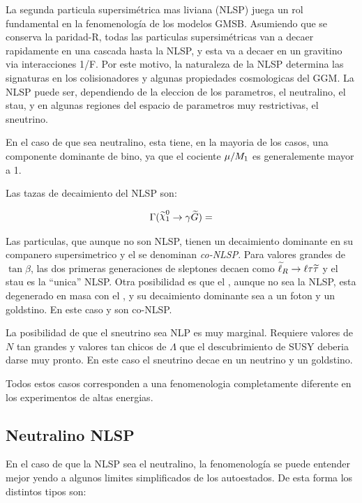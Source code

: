 La segunda particula supersimétrica mas liviana (NLSP) juega un rol
fundamental en la fenomenología de los modelos GMSB. Asumiendo que se
conserva la paridad-R, todas las particulas supersimétricas van a decaer
rapidamente en una cascada hasta la NLSP, y esta va a decaer en un gravitino
via interacciones 1/F. Por este motivo, la naturaleza de la NLSP
determina las signaturas en los colisionadores y algunas propiedades
cosmologicas del GGM. La NLSP puede ser, dependiendo de la eleccion 
de los parametros, el neutralino, el stau, y en algunas regiones del
espacio de parametros muy restrictivas, el sneutrino.

En el caso de que sea neutralino, esta tiene, en la mayoria de los
casos, una componente dominante de bino, ya que el cociente $\mu/M_{1}$
es generalemente mayor a 1. %

Las tazas de decaimiento del {\ninoone} NLSP son:

\begin{align}
  \Gamma (\ninoone \to \gamma \gravino) =
\end{align}

Las particulas, que aunque no son NLSP, tienen un decaimiento dominante en
su companero supersimetrico y el {\gravino} se denominan \emph{co-NLSP}.
Para valores grandes de $\tan \beta$, las dos primeras generaciones de
sleptones decaen como $\widetilde{\ell}_R \rightarrow \ell \tau \widetilde{\tau}$ y el stau
es la ``unica'' NLSP. Otra posibilidad es que el {\ninoone}, aunque no sea
la NLSP, esta degenerado en masa con el {\stau}, y su decaimiento dominante
sea a un foton y un goldstino. En este caso {\stau} y {\ninoone} son co-NLSP.

La posibilidad de que el sneutrino sea NLP es muy marginal. Requiere valores
de $N$ tan grandes y valores tan chicos de $\Lambda$ que el descubrimiento de
SUSY deberia darse muy pronto. En este caso el sneutrino decae en un neutrino
y un goldstino.

Todos estos casos corresponden a una fenomenologia completamente diferente en
los experimentos de altas energias.

\subsection{Neutralino NLSP}

En el caso de que la NLSP sea el neutralino, la fenomenología se puede entender
mejor yendo a algunos limites simplificados de los autoestados. De esta forma
los distintos tipos son:

